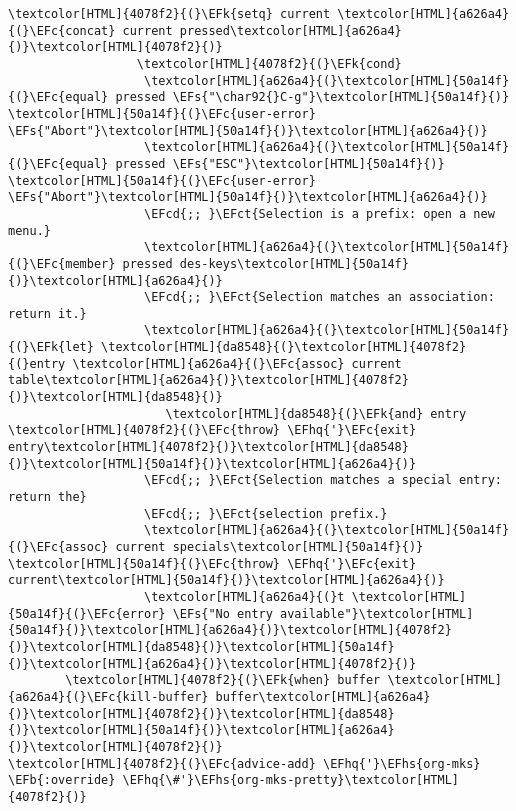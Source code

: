 \documentclass{scrartcl}
\newcommand{\EFk}[1]{\textcolor{EFk}{#1}} %
\newcommand{\EFs}[1]{\textcolor{EFs}{#1}} %
\newcommand{\EFb}[1]{\textcolor{EFb}{#1}} %
\newcommand{\EFct}[1]{\textcolor{EFct}{#1}} %
\newcommand{\EFc}[1]{\textcolor{EFc}{#1}} %
\newcommand{\EFcd}[1]{\textcolor{EFcd}{#1}} %
\newcommand{\EFhq}[1]{\textcolor{EFhq}{#1}} %
\newcommand{\EFhs}[1]{\textcolor{EFhs}{#1}} %
\begin{document}
\begin{Code}
\begin{Verbatim}[]
                  \textcolor[HTML]{4078f2}{(}\EFk{setq} current \textcolor[HTML]{a626a4}{(}\EFc{concat} current pressed\textcolor[HTML]{a626a4}{)}\textcolor[HTML]{4078f2}{)}
                  \textcolor[HTML]{4078f2}{(}\EFk{cond}
                   \textcolor[HTML]{a626a4}{(}\textcolor[HTML]{50a14f}{(}\EFc{equal} pressed \EFs{"\char92{}C-g"}\textcolor[HTML]{50a14f}{)} \textcolor[HTML]{50a14f}{(}\EFc{user-error} \EFs{"Abort"}\textcolor[HTML]{50a14f}{)}\textcolor[HTML]{a626a4}{)}
                   \textcolor[HTML]{a626a4}{(}\textcolor[HTML]{50a14f}{(}\EFc{equal} pressed \EFs{"ESC"}\textcolor[HTML]{50a14f}{)} \textcolor[HTML]{50a14f}{(}\EFc{user-error} \EFs{"Abort"}\textcolor[HTML]{50a14f}{)}\textcolor[HTML]{a626a4}{)}
                   \EFcd{;; }\EFct{Selection is a prefix: open a new menu.}
                   \textcolor[HTML]{a626a4}{(}\textcolor[HTML]{50a14f}{(}\EFc{member} pressed des-keys\textcolor[HTML]{50a14f}{)}\textcolor[HTML]{a626a4}{)}
                   \EFcd{;; }\EFct{Selection matches an association: return it.}
                   \textcolor[HTML]{a626a4}{(}\textcolor[HTML]{50a14f}{(}\EFk{let} \textcolor[HTML]{da8548}{(}\textcolor[HTML]{4078f2}{(}entry \textcolor[HTML]{a626a4}{(}\EFc{assoc} current table\textcolor[HTML]{a626a4}{)}\textcolor[HTML]{4078f2}{)}\textcolor[HTML]{da8548}{)}
                      \textcolor[HTML]{da8548}{(}\EFk{and} entry \textcolor[HTML]{4078f2}{(}\EFc{throw} \EFhq{'}\EFc{exit} entry\textcolor[HTML]{4078f2}{)}\textcolor[HTML]{da8548}{)}\textcolor[HTML]{50a14f}{)}\textcolor[HTML]{a626a4}{)}
                   \EFcd{;; }\EFct{Selection matches a special entry: return the}
                   \EFcd{;; }\EFct{selection prefix.}
                   \textcolor[HTML]{a626a4}{(}\textcolor[HTML]{50a14f}{(}\EFc{assoc} current specials\textcolor[HTML]{50a14f}{)} \textcolor[HTML]{50a14f}{(}\EFc{throw} \EFhq{'}\EFc{exit} current\textcolor[HTML]{50a14f}{)}\textcolor[HTML]{a626a4}{)}
                   \textcolor[HTML]{a626a4}{(}t \textcolor[HTML]{50a14f}{(}\EFc{error} \EFs{"No entry available"}\textcolor[HTML]{50a14f}{)}\textcolor[HTML]{a626a4}{)}\textcolor[HTML]{4078f2}{)}\textcolor[HTML]{da8548}{)}\textcolor[HTML]{50a14f}{)}\textcolor[HTML]{a626a4}{)}\textcolor[HTML]{4078f2}{)}
        \textcolor[HTML]{4078f2}{(}\EFk{when} buffer \textcolor[HTML]{a626a4}{(}\EFc{kill-buffer} buffer\textcolor[HTML]{a626a4}{)}\textcolor[HTML]{4078f2}{)}\textcolor[HTML]{da8548}{)}\textcolor[HTML]{50a14f}{)}\textcolor[HTML]{a626a4}{)}\textcolor[HTML]{4078f2}{)}
\textcolor[HTML]{4078f2}{(}\EFc{advice-add} \EFhq{'}\EFhs{org-mks} \EFb{:override} \EFhq{\#'}\EFhs{org-mks-pretty}\textcolor[HTML]{4078f2}{)}
\end{Verbatim}
\end{Code}
\end{document}

